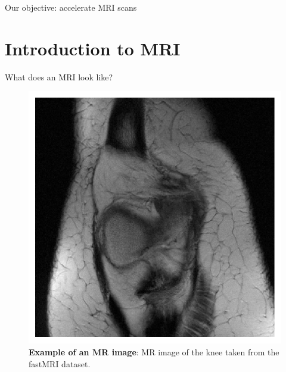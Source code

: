 \documentclass[aspectratio=169,xcolor=dvipsnames]{beamer}
\begin{document}
\begin{frame}{Our objective: accelerate MRI scans}
    \begin{multicols}{2}
    \tableofcontents
    \end{multicols}
\end{frame}

\section{Introduction to MRI}
\begin{frame}{What does an MRI look like?}
    \begin{figure}
        \centering
        \includegraphics[height=0.6\textheight]{Figures/intro_figures/example_knee_fastmri.pdf}
        \caption{\label{fig:mri-example} \textbf{Example of an MR image}: MR image of the knee taken from the fastMRI dataset.}
    \end{figure}
\end{frame}
\end{document}
